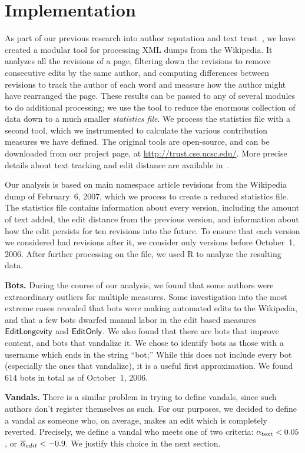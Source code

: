\section{Implementation}

As part of our previous research into author reputation
and text trust~\cite{Adler2007,trust-techrep-07}, we have
created a modular tool for processing XML dumps from
the Wikipedia.
It analyzes all the revisions of a page,
filtering down the revisions to remove consecutive edits
by the same author, and computing differences between
revisions to track the author of each word and measure
how the author might have rearranged the page.
These results can be passed to any of several
modules to do additional processing; we use the tool
to reduce the enormous collection of data down to
a much smaller \textit{statistics file}.
We process the statistics file with a second tool,
which we instrumented to calculate the various
contribution measures we have defined.
The original tools are open-source, and can be downloaded
from our project page, at \url{http://trust.cse.ucsc.edu/}.
More precise details about text tracking and edit distance
are available in~\cite{Adler2007}.

Our analysis is based on main namespace article revisions from
the Wikipedia dump of February~6, 2007,
which we process to create a reduced statistics file.
The statistics file contains information about every version,
including the amount of text added, the edit distance from
the previous version, and information about how the edit
persists for ten revisions into the future.
To ensure that each version we considered had revisions
after it, we consider only versions before October~1, 2006.
After further processing on the file,
we used R\cite{R2007} to analyze the resulting data.

\textbf{Bots.}
During the course of our analysis, we found that
some authors were extraordinary outliers for multiple measures.
Some investigation into the most extreme cases revealed
that bots were making automated edits to the Wikipedia,
and that a few bots dwarfed manual labor in the edit based
measures $\mathsf{EditLongevity}$ and $\mathsf{EditOnly}$.
We also found that there are bots that improve content,
and bots that vandalize it.
We chose to identify bots as those with a username which
ends in the string ``bot;''
While this does not include every bot (especially
the ones that vandalize), it is a useful first approximation.
We found $614$ bots in total as of October~1, 2006.

\textbf{Vandals.}
There is a similar problem in trying to define vandals,
since such authors don't register themselves as such.
For our purposes, we decided to define a vandal
as someone who, on average, makes an edit which is
completely reverted.
Precisely, we define a vandal who meets one of two criteria:
$\alpha_\text{text} < 0.05$, or ${\overline{\alpha}}_{edit} < -0.9$.
We justify this choice in the next section.
